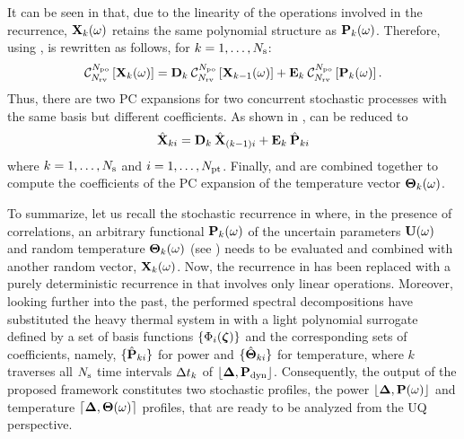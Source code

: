 It can be seen in  that, due to the linearity of the operations involved in the recurrence, $\mathbf{X}_k(\omega)$ retains the same polynomial structure as $\mathbf{P}_k(\omega)$. Therefore, using ,  is rewritten as follows, for $k = 1, \dotsc, N_\text{s}$:
\begin{equation} \elabel{expanded-recurrence}
  \oPC{\vars}{\pcorder}{\vX_k(\o)} = \mCF_k \: \oPC{\vars}{\pcorder}{\vX_{k-1}(\o)} + \mCS_k \: \oPC{\vars}{\pcorder}{\vP_k(\o)}.
\end{equation}
Thus, there are two PC expansions for two concurrent stochastic processes with the same basis but different coefficients. As shown in ,  can be reduced to
\begin{equation} \elabel{pc-recurrence}
  \pcc{\vX}_{ki} = \mCF_k \: \pcc{\vX}_{(k - 1)i} + \mCS_k \: \pcc{\vP}_{ki}
\end{equation}
where $k = 1, \dotsc, N_\text{s}$ and $i = 1, \dotsc, {N_\text{pt}}$. Finally,  and  are combined together to compute the coefficients of the PC expansion of the temperature vector ${\boldsymbol\Theta}_k(\omega)$.

To summarize, let us recall the stochastic recurrence in  where, in the presence of correlations, an arbitrary functional $\mathbf{P}_k(\omega)$ of the uncertain parameters $\mathbf{U}(\omega)$ and random temperature ${\boldsymbol\Theta}_k(\omega)$ (see ) needs to be evaluated and combined with another random vector, $\mathbf{X}_k(\omega)$. Now, the recurrence in  has been replaced with a purely deterministic recurrence in  that involves only linear operations. Moreover, looking further into the past, the performed spectral decompositions have substituted the heavy thermal system in  with a light polynomial surrogate defined by a set of basis functions $\{ \Phi_i(\boldsymbol{\zeta}) \}$ and the corresponding sets of coefficients, namely, $\{ \hat{\mathbf{P}}_{ki} \}$ for power and $\{ \hat{{\boldsymbol\Theta}}_{ki} \}$ for temperature, where $k$ traverses all $N_\text{s}$ time intervals $\Delta t_k$ of $\profPdyn$. Consequently, the output of the proposed framework constitutes two stochastic profiles, the power $\profP{\o}$ and temperature $\profT{\o}$ profiles, that are ready to be analyzed from the UQ perspective.
